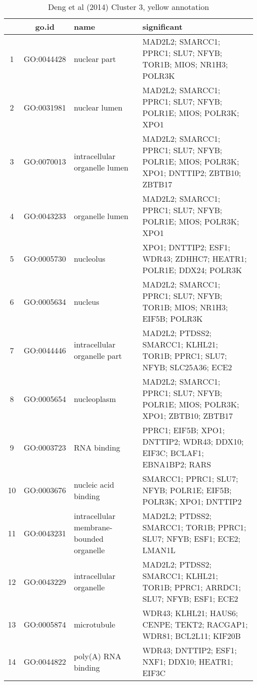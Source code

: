\begin{table}[htp]
\begin{center}
\caption{Deng et al (2014) Cluster 3, yellow annotation} \label{tab:tab8}
\begin{tabular}{|c|c|p{1.5in}|p{4in}|}
  \hline
 & go.id & name  & significant \\ 
  \hline
1 & GO:0044428 & nuclear part  & \footnotesize{MAD2L2; SMARCC1; PPRC1; SLU7; NFYB; TOR1B; MIOS; NR1H3; POLR3K} \\ 
  2 & GO:0031981 & nuclear lumen & \footnotesize{MAD2L2; SMARCC1; PPRC1; SLU7; NFYB; POLR1E; MIOS; POLR3K; XPO1}\\ 
  3 & GO:0070013 & intracellular organelle lumen & \footnotesize{MAD2L2; SMARCC1; PPRC1; SLU7; NFYB; POLR1E; MIOS; POLR3K; XPO1; DNTTIP2; ZBTB10; ZBTB17} \\ 
  4 & GO:0043233 & organelle lumen & \footnotesize{MAD2L2; SMARCC1; PPRC1; SLU7; NFYB; POLR1E; MIOS; POLR3K; XPO1} \\ 
  5 & GO:0005730 & nucleolus & \footnotesize{XPO1; DNTTIP2; ESF1; WDR43; ZDHHC7; HEATR1; POLR1E; DDX24; POLR3K} \\ 
  6 & GO:0005634 & nucleus & \footnotesize{MAD2L2; SMARCC1; PPRC1; SLU7; NFYB; TOR1B; MIOS; NR1H3; EIF5B; POLR3K} \\ 
  7 & GO:0044446 & intracellular organelle part & \footnotesize{MAD2L2; PTDSS2; SMARCC1; KLHL21; TOR1B; PPRC1; SLU7; NFYB; SLC25A36; ECE2} \\ 
  8 & GO:0005654 & nucleoplasm & \footnotesize{MAD2L2; SMARCC1; PPRC1; SLU7; NFYB; POLR1E; MIOS; POLR3K; XPO1; ZBTB10; ZBTB17} \\ 
  9 & GO:0003723 & RNA binding & \footnotesize{PPRC1; EIF5B; XPO1; DNTTIP2; WDR43; DDX10; EIF3C; BCLAF1; EBNA1BP2; RARS}\\ 
  10 & GO:0003676 & nucleic acid binding & \footnotesize{SMARCC1; PPRC1; SLU7; NFYB; POLR1E; EIF5B; POLR3K; XPO1; DNTTIP2} \\ 
  11 & GO:0043231 & intracellular membrane-bounded organelle &  \footnotesize{MAD2L2; PTDSS2; SMARCC1; TOR1B; PPRC1; SLU7; NFYB; ESF1; ECE2; LMAN1L} \\ 
  12 & GO:0043229 & intracellular organelle & \footnotesize{MAD2L2; PTDSS2; SMARCC1; KLHL21; TOR1B; PPRC1; ARRDC1; SLU7; NFYB; ESF1; ECE2} \\ 
  13 & GO:0005874 & microtubule & \footnotesize{WDR43; KLHL21; HAUS6; CENPE; TEKT2; RACGAP1; WDR81; BCL2L11; KIF20B} \\ 
  14 & GO:0044822 & poly(A) RNA binding & \footnotesize{WDR43; DNTTIP2; ESF1; NXF1; DDX10; HEATR1; EIF3C} \\ 

\end{tabular}
\end{center}
\end{table}
